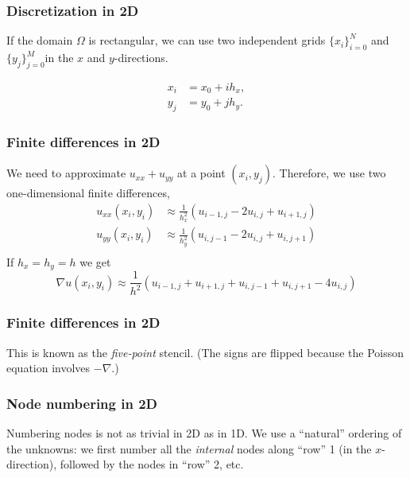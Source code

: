 \begin{frame}
  \frametitle{Discretization in 2D}
  If the domain $\Omega$ is rectangular, we can use two independent grids
  $\{x_i\}_{i=0}^N$ and $\{y_j\}_{j=0}^M$in the $x$ and $y$-directions.
  \begin{center}
    \scalebox{0.7}{}
  \end{center}
  \begin{align*}
    x_i &= x_0 + ih_x, \\
    y_j &= y_0 + jh_y.
  \end{align*}
\end{frame}

\begin{frame}
  \frametitle{Finite differences in 2D}
  We need to approximate $u_{xx} + u_{yy}$ at a point $(x_i, y_j)$. Therefore,
  we use two one-dimensional finite differences,
  \begin{align*}
    u_{xx}(x_i, y_i) &\approx \frac{1}{h_x^2}
                       \left( u_{i-1,j} - 2u_{i,j} + u_{i+1,j} \right) \\
    u_{yy}(x_i, y_i) &\approx \frac{1}{h_y^2}
                       \left( u_{i,j-1} - 2u_{i,j} + u_{i,j+1} \right) \\
  \end{align*}
  If $h_x = h_y = h$ we get
  \[
    \nabla u(x_i, y_i) \approx \frac{1}{h^2}
    \left( u_{i-1,j} + u_{i+1,j} + u_{i,j-1} + u_{i,j+1} - 4u_{i,j} \right)
  \]
\end{frame}

\begin{frame}
  \frametitle{Finite differences in 2D}
  This is known as the \emph{five-point} stencil. (The signs are flipped because
  the Poisson equation involves $-\nabla$.)
  \begin{center}
    
  \end{center}
\end{frame}

\begin{frame}
  \frametitle{Node numbering in 2D}
  Numbering nodes is not as trivial in 2D as in 1D. We use a ``natural''
  ordering of the unknowns: we first number all the \emph{internal} nodes along
  ``row'' 1 (in the $x$-direction), followed by the nodes in ``row'' 2, etc.
  \begin{center}
    
  \end{center}
\end{frame}

